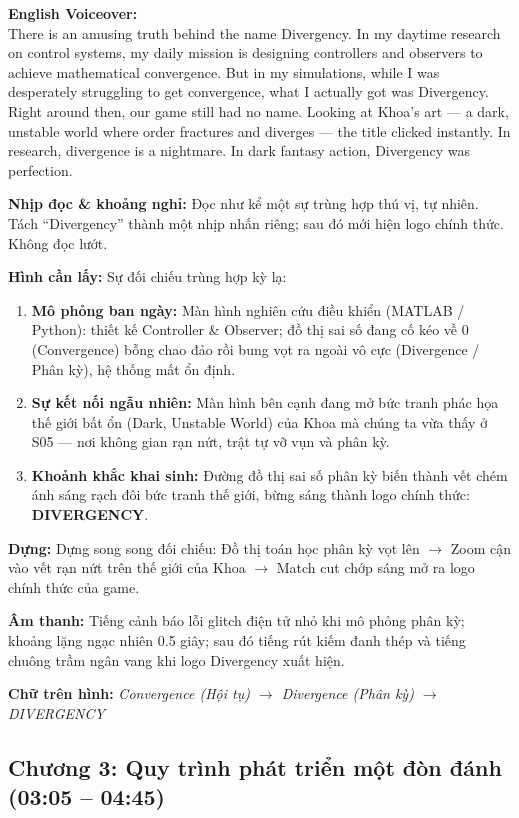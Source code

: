 \documentclass[11pt,a4paper]{article}
\newcommand{\field}[2]{\textbf{\color{divergencynavy}#1:} #2\par\vspace{2pt}}
\newcommand{\voBox}[2]{%
  \vspace{3pt}%
  \noindent\colorbox{codebg}{%
    \parbox{\dimexpr\linewidth-2\fboxsep}{%
      \textbf{\color{divergencynavy}#1:}\\
      #2%
    }%
  }\par\vspace{3pt}%
}
\begin{document}
\voBox{English Voiceover}{There is an amusing truth behind the name Divergency. In my daytime research on control systems, my daily mission is designing controllers and observers to achieve mathematical convergence. But in my simulations, while I was desperately struggling to get convergence, what I actually got was Divergency. Right around then, our game still had no name. Looking at Khoa's art — a dark, unstable world where order fractures and diverges — the title clicked instantly. In research, divergence is a nightmare. In dark fantasy action, Divergency was perfection.}

\field{Nhịp đọc \& khoảng nghỉ}{Đọc như kể một sự trùng hợp thú vị, tự nhiên. Tách “Divergency” thành một nhịp nhấn riêng; sau đó mới hiện logo chính thức. Không đọc lướt.}

\field{Hình cần lấy}{Sự đối chiếu trùng hợp kỳ lạ:
\begin{enumerate}
    \item \textbf{Mô phỏng ban ngày:} Màn hình nghiên cứu điều khiển (MATLAB / Python): thiết kế Controller \& Observer; đồ thị sai số đang cố kéo về 0 (Convergence) bỗng chao đảo rồi bung vọt ra ngoài vô cực (Divergence / Phân kỳ), hệ thống mất ổn định.
    \item \textbf{Sự kết nối ngẫu nhiên:} Màn hình bên cạnh đang mở bức tranh phác họa thế giới bất ổn (Dark, Unstable World) của Khoa mà chúng ta vừa thấy ở S05 — nơi không gian rạn nứt, trật tự vỡ vụn và phân kỳ.
    \item \textbf{Khoảnh khắc khai sinh:} Đường đồ thị sai số phân kỳ biến thành vết chém ánh sáng rạch đôi bức tranh thế giới, bừng sáng thành logo chính thức: \textbf{DIVERGENCY}.
\end{enumerate}}

\field{Dựng}{Dựng song song đối chiếu: Đồ thị toán học phân kỳ vọt lên $\rightarrow$ Zoom cận vào vết rạn nứt trên thế giới của Khoa $\rightarrow$ Match cut chớp sáng mở ra logo chính thức của game.}

\field{Âm thanh}{Tiếng cảnh báo lỗi glitch điện tử nhỏ khi mô phỏng phân kỳ; khoảng lặng ngạc nhiên 0.5 giây; sau đó tiếng rút kiếm đanh thép và tiếng chuông trầm ngân vang khi logo Divergency xuất hiện.}

\field{Chữ trên hình}{\textit{Convergence (Hội tụ) $\rightarrow$ Divergence (Phân kỳ) $\rightarrow$ DIVERGENCY}}

\newpage
\subsection*{Chương 3: Quy trình phát triển một đòn đánh (03:05 -- 04:45)}
\end{document}

